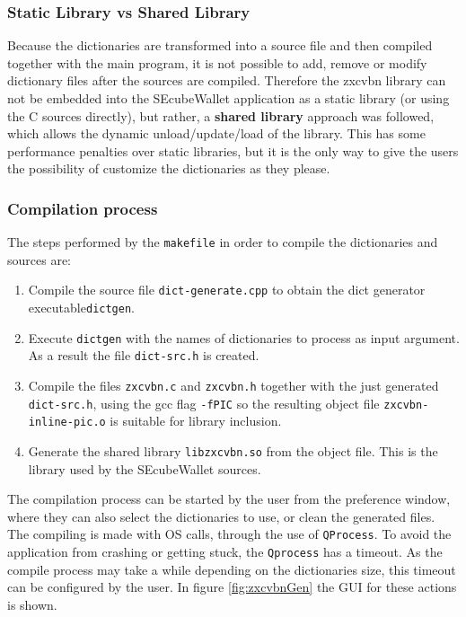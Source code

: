 \subsubsection{Static Library vs Shared Library}

Because the dictionaries are transformed into a source file and then compiled together with the main program, it is not possible to add, remove or modify dictionary files after the sources are compiled. Therefore the zxcvbn library can not be embedded into the SEcubeWallet application as a static library (or using the C sources directly), but rather, a \textbf{shared library} approach was followed, which allows the dynamic unload/update/load of the library. This has some performance penalties over static libraries, but it is the only way to give the users the possibility of customize the dictionaries as they please.

\subsubsection{Compilation process}

The steps performed by the \texttt{makefile} in order to compile the dictionaries and sources are:

\begin{enumerate}
\setlength\itemsep{0pt}
\item Compile the source file \texttt{dict-generate.cpp} to obtain the dict generator executable\texttt{dictgen}.
\item Execute \texttt{dictgen} with the names of dictionaries to process as input argument. As a result the file \texttt{dict-src.h} is created.
\item Compile the files \texttt{zxcvbn.c} and \texttt{zxcvbn.h} together with the just generated \texttt{dict-src.h}, using the gcc flag \texttt{-fPIC} so the resulting object file \texttt{zxcvbn-inline-pic.o} is suitable for library inclusion.
\item Generate the shared library \texttt{libzxcvbn.so} from the object file. This is the library used by the SEcubeWallet sources.
\end{enumerate}

The compilation process can be started by the user from the preference window, where they can also select the dictionaries to use, or clean the generated files. The compiling is made with OS calls, through the use of \texttt{QProcess}. To avoid the application from crashing or getting stuck, the \texttt{Qprocess} has a timeout. As the compile process may take a while depending on the dictionaries size, this timeout can be configured by the user. In figure \ref{fig:zxcvbnGen} the GUI for these actions is shown.

